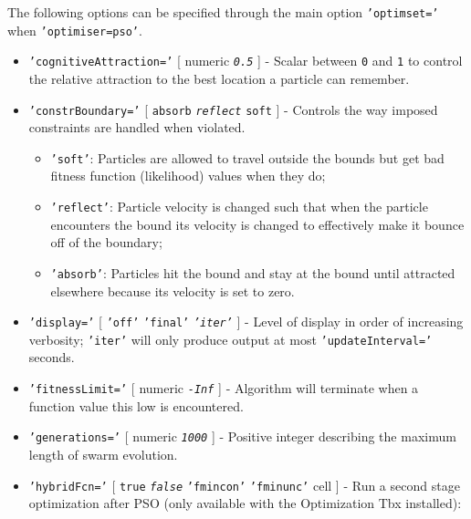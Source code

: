 The following options can be specified through the main option
\texttt{'optimset='} when \texttt{'optimiser=pso'}.

\begin{itemize}
\item
  \texttt{'cognitiveAttraction='} {[} numeric \textbar{}
  \emph{\texttt{0.5}} {]} - Scalar between \texttt{0} and \texttt{1} to
  control the relative attraction to the best location a particle can
  remember.
\item
  \texttt{'constrBoundary='} {[} \texttt{absorb} \textbar{}
  \emph{\texttt{reflect}} \textbar{} \texttt{soft} {]} - Controls the
  way imposed constraints are handled when violated.

  \begin{itemize}
  \item
    \texttt{'soft'}: Particles are allowed to travel outside the bounds
    but get bad fitness function (likelihood) values when they do;
  \item
    \texttt{'reflect'}: Particle velocity is changed such that when the
    particle encounters the bound its velocity is changed to effectively
    make it bounce off of the boundary;
  \item
    \texttt{'absorb'}: Particles hit the bound and stay at the bound
    until attracted elsewhere because its velocity is set to zero.
  \end{itemize}
\item
  \texttt{'display='} {[} \texttt{'off'} \textbar{} \texttt{'final'}
  \textbar{} \emph{\texttt{'iter'}} {]} - Level of display in order of
  increasing verbosity; \texttt{'iter'} will only produce output at most
  \texttt{'updateInterval='} seconds.
\item
  \texttt{'fitnessLimit='} {[} numeric \textbar{} \emph{\texttt{-Inf}}
  {]} - Algorithm will terminate when a function value this low is
  encountered.
\item
  \texttt{'generations='} {[} numeric \textbar{} \emph{\texttt{1000}}
  {]} - Positive integer describing the maximum length of swarm
  evolution.
\item
  \texttt{'hybridFcn='} {[} \texttt{true} \textbar{}
  \emph{\texttt{false}} \textbar{} \texttt{'fmincon'} \textbar{}
  \texttt{'fminunc'} \textbar{} cell {]} - Run a second stage
  optimization after PSO (only available with the Optimization Tbx
  installed):


\end{itemize}
